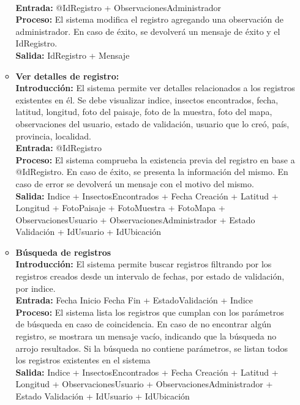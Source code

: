 \begin{enumerate}[A.]
\begin{itemize}
            \\ \textbf{Entrada:} @IdRegistro + ObservacionesAdministrador
            \\ \textbf{Proceso:} El sistema modifica el registro agregando una observación de administrador. En caso de éxito, se devolverá un mensaje de éxito y el IdRegistro.
            \\ \textbf{Salida:} IdRegistro + Mensaje
            \\
          \item \textbf{Ver detalles de registro:}
            \\ \textbf{Introducción:} El sistema permite ver detalles relacionados a los registros existentes en él. Se debe visualizar indice, insectos encontrados, fecha, latitud, longitud, foto del paisaje, foto de la muestra, foto del mapa, observaciones del usuario, estado de validación, usuario que lo creó, país, provincia, localidad.
            \\ \textbf{Entrada:} @IdRegistro
            \\ \textbf{Proceso:} El sistema comprueba la existencia previa del registro en base a @IdRegistro. En caso de éxito, se presenta la información del mismo. En caso de error se devolverá un mensaje con el motivo del mismo.
            \\ \textbf{Salida:} Indice + InsectosEncontrados + Fecha Creación + Latitud + Longitud + FotoPaisaje + FotoMuestra + FotoMapa + ObservacionesUsuario + ObservacionesAdministrador + Estado Validación + IdUsuario + IdUbicación
            \\
          \item \textbf{Búsqueda de registros}
            \\ \textbf{Introducción:} El sistema permite buscar registros filtrando por los registros creados desde un intervalo de fechas, por estado de validación, por indice.
            \\ \textbf{Entrada:} Fecha Inicio Fecha Fin + EstadoValidación + Indice
            \\ \textbf{Proceso:} El sistema lista los registros que cumplan con los parámetros de búsqueda en caso de coincidencia. En caso de no encontrar algún registro, se mostrara un mensaje vacío, indicando que la búsqueda no arrojo resultados. Si la búsqueda no contiene parámetros, se listan todos los registros existentes en el sistema
            \\ \textbf{Salida:} Indice + InsectosEncontrados + Fecha Creación + Latitud + Longitud + ObservacionesUsuario + ObservacionesAdministrador + Estado Validación + IdUsuario + IdUbicación
        \end{itemize}


\end{enumerate}
